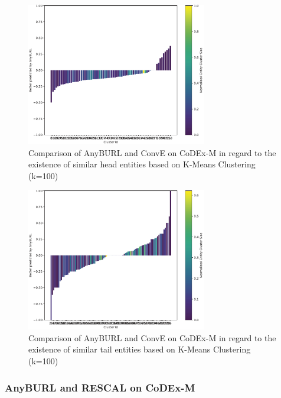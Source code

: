 \begin{figure}[H]
\centering
\includegraphics[width=0.7\textwidth]{images/head_cluster_100_anyburl_conve_codex.PNG}
\caption{Comparison of AnyBURL and ConvE on CoDEx-M in regard to the existence of similar head entities based on K-Means Clustering (k=100)}
\label{fig:head_cluster_100_anyburl_conve_codex}
\end{figure}

\begin{figure}[H]
\centering
\includegraphics[width=0.7\textwidth]{images/tail_cluster_100_anyburl_conve_codex.PNG}
\caption{Comparison of AnyBURL and ConvE on CoDEx-M in regard to the existence of similar tail entities based on K-Means Clustering (k=100)}
\label{fig:tail_cluster_100_anyburl_conve_codex}
\end{figure}

\subsubsection{AnyBURL and RESCAL on CoDEx-M}

